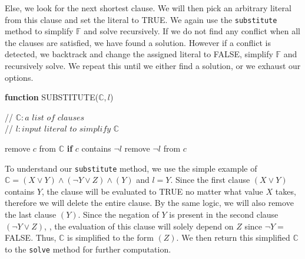 \documentclass[11pt,fancychapters]{report}
\theoremstyle{definition}
\begin{document}
Else, we look for the next shortest clause. We will then pick an arbitrary literal from this clause and set the literal to TRUE. We again use the \texttt{substitute} method to simplify $\mathbb{F}$ and solve recursively. If we do not find any conflict when all the clauses are satisfied, we have found a solution. However if a conflict is detected, we backtrack and change the assigned literal to FALSE, simplify $\mathbb{F}$ and recursively solve. We repeat this until we either find a solution, or we exhaust our options. 
\begin{algorithm}[H]
	\caption*{\textbf{function} SUBSTITUTE($\mathbb{C}, l$)}
	// $\mathbb{C}: \textit{a list of clauses}$\\
	// $l: \textit{input literal to simplify } \mathbb{C}$
	\begin{algorithmic}[1]
	        \State remove $c$ from $\mathbb{C}$
	    \Else \textbf{ if} {$c$ contains $\neg l$}
	        \State remove $\neg l$ from $c$
	    \EndIf
	\EndFor
	\end{algorithmic} 
\end{algorithm}
To understand our \texttt{substitute} method, we use the simple example of $\mathbb{C} = (X\vee Y) \wedge (\neg Y \vee Z)\wedge (Y)$ and $l = Y$. Since the first clause $(X\vee Y)$ contains $Y$, the clause will be evaluated to TRUE no matter what value $X$ takes, therefore we will delete the entire clause. By the same logic, we will also remove the last clause $(Y)$. Since the negation of $Y$ is present in the second clause $(\neg Y \vee Z)$, , the evaluation of this clause will solely depend on $Z$ since $\neg Y = $ FALSE. Thus, $\mathbb{C}$ is simplified to the form $(Z)$. We then return this simplified $\mathbb{C}$ to the \texttt{solve} method for further computation.
\end{document}
